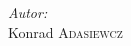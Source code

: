 \begin{titlepage}

\flushright
\Large \emph{Autor:}\\
Konrad \textsc{Adasiewcz}\\[3cm] %


{\large {}}\\[3cm] %


\vfill %

\end{titlepage}